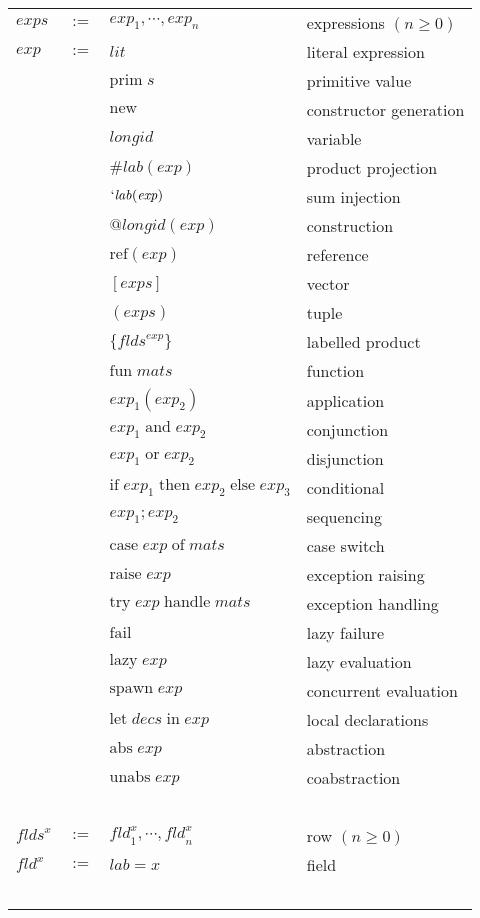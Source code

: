 \documentclass[twoside]{article}
\newcommand{\x}[1]{\mathit{#1}}
\newcommand{\f}[1]{\mbox{#1}}
\newcommand{\lab}{\x{lab}}
\newcommand{\longid}{\x{longid}}
\newcommand{\lit}{\x{lit}}
\renewcommand{\exp}{\x{exp}}
\newcommand{\exps}{\x{exps}}
\newcommand{\fld}{\x{fld}}
\newcommand{\flds}{\x{flds}}
\newcommand{\mats}{\x{mats}}
\newcommand{\decs}{\x{decs}}
\begin{document}
\begin{center}
\begin{tabular}{lcll}

$\exps$	&$:=$&	$\exp_1,\cdots,\exp_n$		& expressions $(n\geq0)$ \\
$\exp$	&$:=$&	$\lit$				& literal expression \\
	&&	$\f{prim}\;\x{s}$		& primitive value \\
	&&	$\f{new}$			& constructor generation \\
	&&	$\longid$			& variable \\
	&&	$\#\lab(\exp)$			& product projection \\
	&&	$`\lab(\exp)$			& sum injection \\
	&&	$@\longid(\exp)$		& construction \\
	&&	$\f{ref}(\exp)$			& reference \\
	&&	$[\exps]$			& vector \\
	&&	$(\exps)$			& tuple \\
	&&	$\{\flds^\exp\}$		& labelled product \\
	&&	$\f{fun}\;\mats$		& function \\
	&&	$\exp_1(\exp_2)$		& application \\
	&&	$\exp_1\;\f{and}\;\exp_2$	& conjunction \\
	&&	$\exp_1\;\f{or}\;\exp_2$	& disjunction \\
	&&	$\f{if}\;\exp_1\;\f{then}\;\exp_2\;\f{else}\;\exp_3$
						& conditional \\
	&&	$\exp_1;\exp_2$			& sequencing \\
	&&	$\f{case}\;\exp\;\f{of}\;\mats$ & case switch \\
	&&	$\f{raise}\;\exp$		& exception raising \\
	&&	$\f{try}\;\exp\;\f{handle}\;\mats$ & exception handling \\
	&&	$\f{fail}$			& lazy failure \\
	&&	$\f{lazy}\;\exp$		& lazy evaluation \\
	&&	$\f{spawn}\;\exp$		& concurrent evaluation \\
	&&	$\f{let}\;\decs\;\f{in}\;\exp$	& local declarations \\
	&&	$\f{abs}\;\exp$			& abstraction \\
	&&	$\f{unabs}\;\exp$		& coabstraction \\
\ \\

$\flds^x$&$:=$&	$\fld^x_1,\cdots,\fld^x_n$	& row $(n\geq0)$ \\
$\fld^x$ &$:=$& $\lab = x$			& field \\
\ \\


\end{tabular}
\end{center}
\end{document}
